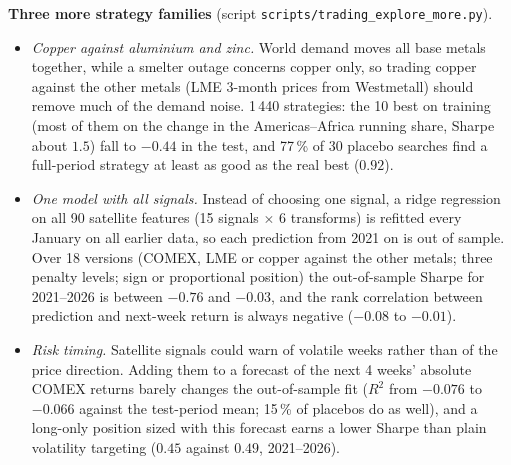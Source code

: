 \documentclass[10pt,a4paper]{article}
\begin{document}
\textbf{Three more strategy families} (script \texttt{scripts/trading\_explore\_more.py}).
\begin{itemize}[leftmargin=1.2em]
  \item \emph{Copper against aluminium and zinc.} World demand moves all base metals together, while a smelter outage concerns copper only, so trading copper against the other metals (LME 3-month prices from Westmetall) should remove much of the demand noise. 1\,440 strategies: the 10 best on training (most of them on the change in the Americas--Africa running share, Sharpe about $1.5$) fall to $-0.44$ in the test, and 77\,\% of 30 placebo searches find a full-period strategy at least as good as the real best ($0.92$).
  \item \emph{One model with all signals.} Instead of choosing one signal, a ridge regression on all 90 satellite features (15 signals $\times$ 6 transforms) is refitted every January on all earlier data, so each prediction from 2021 on is out of sample. Over 18 versions (COMEX, LME or copper against the other metals; three penalty levels; sign or proportional position) the out-of-sample Sharpe for 2021--2026 is between $-0.76$ and $-0.03$, and the rank correlation between prediction and next-week return is always negative ($-0.08$ to $-0.01$).
  \item \emph{Risk timing.} Satellite signals could warn of volatile weeks rather than of the price direction. Adding them to a forecast of the next 4 weeks' absolute COMEX returns barely changes the out-of-sample fit ($R^2$ from $-0.076$ to $-0.066$ against the test-period mean; 15\,\% of placebos do as well), and a long-only position sized with this forecast earns a lower Sharpe than plain volatility targeting ($0.45$ against $0.49$, 2021--2026).
\end{itemize}
\end{document}
